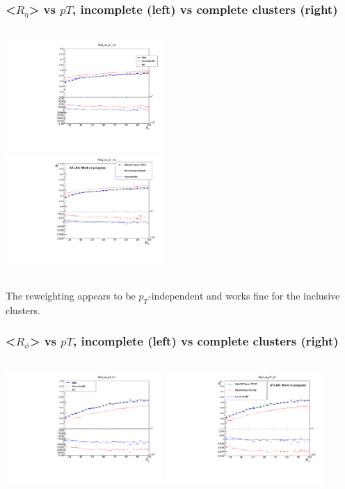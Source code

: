 \documentclass{beamer}
\begin{document}
\begin{frame}
\frametitle{ <$R_\eta$> vs $pT$, incomplete (left) vs complete clusters (right)}

\begin{columns}[t]
\centering
\includegraphics[width=6cm]{Reta_vs_pT_IntSic.pdf}\\
\centering
\includegraphics[width=6cm]{Reta_vs_pT_Int.pdf}\\
\end{columns}
The reweighting appears to be $p_T$-independent and works fine for the inclusive clusters.
\end{frame}
\begin{frame}
\frametitle{ <$R_\phi$> vs $pT$, incomplete (left) vs complete clusters (right)}

\begin{columns}[t]
\centering
\includegraphics[width=6cm]{Rphi_vs_pT_IntSic.pdf}
\centering
\includegraphics[width=6cm]{Rphi_vs_pT_Int.pdf}
\end{columns}
\end{frame}
\end{document}
